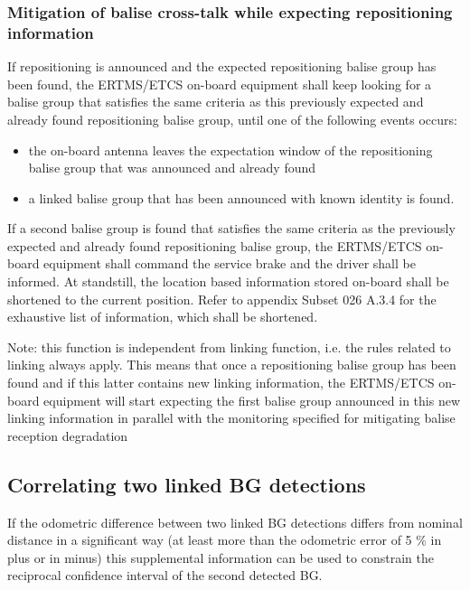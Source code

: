 \subsubsection{Mitigation of balise cross-talk while expecting repositioning information}
If repositioning is announced and the expected repositioning balise group has been found, the ERTMS/ETCS on-board equipment shall keep looking for a balise group that satisfies the same criteria as this previously expected and already found
repositioning balise group, until one of the following events occurs:
\begin{itemize}
\item the on-board antenna leaves the expectation window of the repositioning balise group that was announced and already found
\item a linked balise group that has been announced with known identity is found.
\end{itemize}
If a second balise group is found that satisfies the same criteria as the previously
expected and already found repositioning balise group, the ERTMS/ETCS on-board
equipment shall command the service brake and the driver shall be informed. At
standstill, the location based information stored on-board shall be shortened to the
current position. Refer to appendix Subset 026 A.3.4 for the exhaustive list of information, which shall be shortened.

Note: this function is independent from linking function, i.e. the rules related to
linking always apply. This means that once a repositioning balise group has been found and if this latter contains new linking information, the ERTMS/ETCS on-board equipment will start expecting the first balise group announced in this new linking information in parallel with the monitoring specified for mitigating balise reception degradation


\subsection{Correlating two linked BG detections}
If the odometric difference between two linked BG detections differs from nominal distance in a significant way (at least more than the odometric error of 5 \% in plus or in minus) this supplemental information can be used to constrain the reciprocal confidence interval of the second detected BG.



